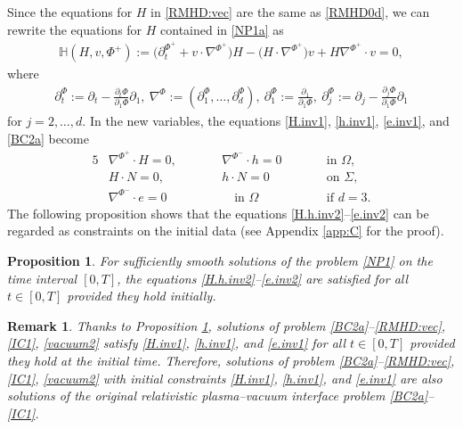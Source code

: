 \documentclass[twoside,11pt]{article}
\numberwithin{equation}{section}
\newtheorem{proposition}[lemma]{Proposition}
\newtheorem{remark}{Remark}[section]
\def\p{\partial}
\begin{document}
Since the equations for $H$ in \eqref{RMHD:vec} are the same as \eqref{RMHD0d}, we can rewrite the equations for $H$ contained in \eqref{NP1a} as
	\begin{align} \label{Hbb:def}
		\mathbb{H}(H,v,\Phi^+):=	
		\big(\p_t^{\Phi^+}+v\cdot \nabla^{\Phi^+}\big)H-\big(H\cdot \nabla^{\Phi^+}\big)v+H\nabla^{\Phi^+}\cdot v=0
		,
	\end{align}
	where %
	\begin{align}
		\label{Phi.d:def}	
		\p_t^{\Phi}:=\p_t-\frac{\p_t\Phi}{\p_1\Phi}\p_1,\
				\nabla^{\Phi}:=(\p_1^{\Phi},\ldots,\p_d^{\Phi}),\
		\p_1^{\Phi}:=\frac{\p_1}{\p_1\Phi},\
		\p_j^{\Phi}:=\p_j-\frac{\p_j\Phi}{\p_1\Phi}\p_1
	\end{align}
	for $j=2,\ldots,d$.
	In the new variables, the equations \eqref{H.inv1}, \eqref{h.inv1}, \eqref{e.inv1}, and \eqref{BC2a} become
	\begin{alignat}{5}
		\label{H.h.inv2}
		   &\nabla^{\Phi^+}\cdot H  =0,\qquad&& \nabla^{\Phi^-}\cdot h  =0\qquad& &\textrm{in  }    \Omega,
		\\[0.5mm]
		\label{H.h.cons2}
		&   H\cdot N=0,\quad& &h\cdot N=0 \qquad && \textrm{on }    \Sigma,\\[0.5mm]
 \label{e.inv2}
	&\nabla^{\Phi^-}\cdot e  =0&&\quad
	 \textrm{in  }   \Omega\qquad&& \textrm{if }d=3.
\end{alignat}	
The following proposition shows that the equations \eqref{H.h.inv2}--\eqref{e.inv2} can be regarded as constraints on the initial data (see Appendix \ref{app:C} for the proof).
\begin{proposition}
	\label{Pro:invol}
For sufficiently smooth solutions of the problem \eqref{NP1} on the time interval $[0,T]$,
the equations \eqref{H.h.inv2}--\eqref{e.inv2} are satisfied for all $t\in [0,T]$ provided they hold initially.	
\end{proposition}	
\begin{remark} \label{Rem1}
Thanks to Proposition \ref{Pro:invol},
solutions of  %
problem \eqref{BC2a}--\eqref{RMHD:vec}, \eqref{IC1}, \eqref{vacuum2} satisfy \eqref{H.inv1}, \eqref{h.inv1}, and \eqref{e.inv1} for all $t\in [0,T]$ provided they hold at the initial time.
Therefore, solutions of problem \eqref{BC2a}--\eqref{RMHD:vec}, \eqref{IC1}, \eqref{vacuum2} with initial constraints \eqref{H.inv1}, \eqref{h.inv1}, and \eqref{e.inv1} are also solutions of the original relativistic plasma--vacuum interface problem \eqref{BC2a}--\eqref{IC1}.	
\end{remark}
\end{document}
